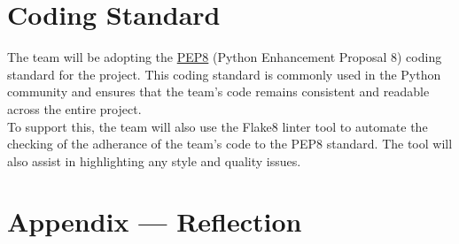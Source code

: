 \documentclass{article}
\begin{document}
\FloatBarrier 

\section{Coding Standard}
The team will be adopting the \href{https://peps.python.org/pep-0008/}{PEP8} (Python Enhancement Proposal 8) 
coding standard for the project. This coding standard is commonly used in the 
Python community and ensures that the team's code remains 
consistent and readable across the entire project.\\
To support this, the team will also use the Flake8 linter tool to automate the 
checking of the adherance of the team's code to the PEP8 standard. The tool will
also assist in highlighting any style and quality issues.

\newpage{}

\section*{Appendix --- Reflection}



\end{document}
